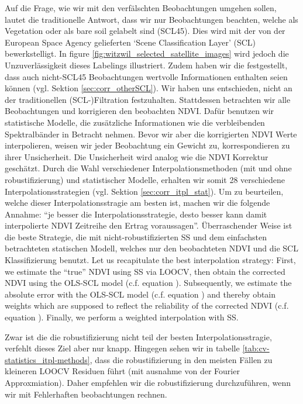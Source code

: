     Auf die Frage, wie wir mit den verfälschten Beobachtungen umgehen sollen, lautet die traditionelle Antwort, dass wir nur Beobachtungen beachten, welche als Vegetation oder als bare soil gelabelt sind (SCL45). Dies wird mit der von der European Space Agency gelieferten `Scene Classification Layer' (SCL) bewerkstelligt. In figure \ref{fig:witzwil_selected_satellite_images} wird jedoch die Unzuverlässigkeit dieses Labelings illustriert. Zudem haben wir die festgestellt, dass auch nicht-SCL45 Beobachtungen wertvolle Informationen enthalten seien können (vgl. Sektion \ref{sec:corr_otherSCL}). Wir haben uns entschieden, nicht an der traditionellen (SCL-)Filtration festzuhalten. Stattdessen betrachten wir alle Beobachtungen und korrigieren den beobachten NDVI. Dafür benutzen wir statistische Modelle, die zusätzliche Informationen wie die verbleibenden Spektralbänder in Betracht nehmen. Bevor wir aber die korrigierten NDVI Werte interpolieren, weisen wir jeder Beobachtung ein Gewicht zu, korrespondieren zu ihrer Unsicherheit. Die Unsicherheit wird analog wie die NDVI Korrektur geschätzt. 
    Durch die Wahl verschiedener Interpolationsmethoden (mit und ohne robustifizierung) und statistischer Modelle, erhalten wir somit 28 verschiedene Interpolationsstrategien (vgl. Sektion \ref{sec:corr_itpl_stat}). Um zu beurteilen, welche dieser Interpolationsstragie am besten ist, machen wir die folgende Annahme: ``je besser die Interpolationsstrategie, desto besser kann damit interpolierte NDVI Zeitreihe den Ertrag voraussagen''. Überraschender Weise ist die beste Strategie, die mit nicht-robustifizierten SS und dem einfachsten betrachteten statischen Modell, welches nur den beobachteten NDVI und die SCL Klassifizierung benutzt.
    Let us recapitulate the best interpolation strategy: First, we estimate the ``true'' NDVI using SS via LOOCV, then obtain the corrected NDVI using the OLS-SCL model (c.f. equation ). Subsequently, we estimate the absolute error with the OLS-SCL model (c.f. equation ) and thereby obtain weights which are supposed to reflect the reliability of the corrected NDVI (c.f. equation ). Finally, we perform a weighted interpolation with SS.

Zwar ist die die robustifizierung nicht teil der besten Interpolationsstragie, verfehlt dieses Ziel aber nur knapp. Hingegen sehen wir in tabelle \ref{tab:cv-statistics_itpl-methods}, dass die robustifizierung in den meisten Fällen zu kleineren LOOCV Residuen führt (mit ausnahme von der Fourier Approxmiation). Daher empfehlen wir die robustifizierung durchzuführen, wenn wir mit Fehlerhaften beobachtungen rechnen. 

